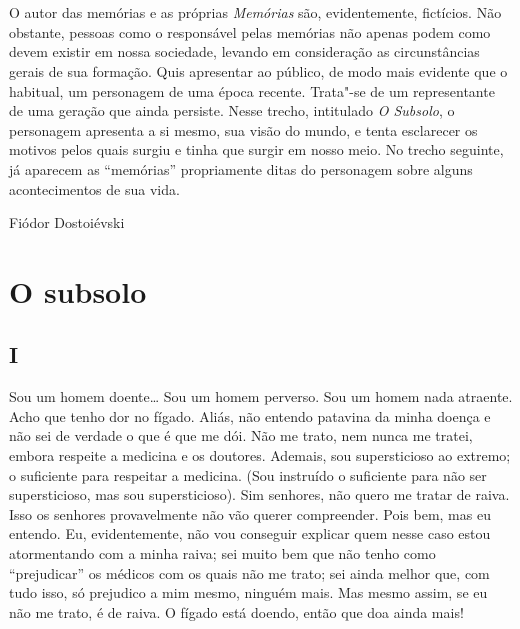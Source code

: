 \chapter*{}
\thispagestyle{empty}

\vfill

O autor das memórias e as próprias \emph{Memórias} são, evidentemente, fictícios. Não obstante, pessoas como o responsável pelas memórias não apenas podem como devem existir
em nossa sociedade, levando em consideração as circunstâncias gerais
de sua formação. Quis apresentar ao público, de modo mais evidente que
o habitual, um personagem de uma época recente. Trata"-se de um
representante de uma geração que ainda persiste. Nesse trecho,
intitulado \emph{O Subsolo}, o personagem apresenta a si mesmo, sua
visão do mundo, e tenta esclarecer os motivos pelos quais surgiu e
tinha que surgir em nosso meio. No trecho seguinte, já aparecem as
``memórias'' propriamente ditas do personagem sobre alguns
acontecimentos de sua vida.

\medskip

\hfill{}Fiódor Dostoiévski

\chapter{O subsolo}

\section{I}

Sou um homem doente\ldots{} Sou um homem perverso. Sou um homem nada
atraente. Acho que tenho dor no fígado. Aliás, não entendo patavina da
minha doença e não sei de verdade o que é que me dói. Não me trato, nem
nunca me tratei, embora respeite a medicina e os doutores. Ademais, sou
supersticioso ao extremo; o suficiente para respeitar a medicina. (Sou
instruído o suficiente para não ser supersticioso, mas sou
supersticioso). Sim senhores, não quero me tratar de raiva. Isso os
senhores provavelmente não vão querer compreender. Pois bem, mas eu
entendo. Eu, evidentemente, não vou conseguir explicar quem nesse caso
estou atormentando com a minha raiva; sei muito bem que não tenho como
``prejudicar'' os médicos com os quais não me trato; sei ainda melhor
que, com tudo isso, só prejudico a mim mesmo, ninguém mais. Mas mesmo
assim, se eu não me trato, é de raiva. O fígado está doendo, então que
doa ainda mais!

